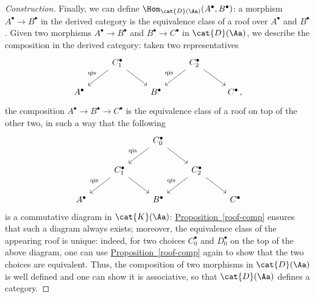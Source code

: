 \begin{thmdef}
\begin{proof}[Construction]
        Finally, we can define $\Hom_{\cat{D}(\Aa)}(A^{\bullet}, B^{\bullet})$:
        a morphism $A^{\bullet} \to B^{\bullet}$ in the derived category
        is the equivalence class of a roof 
        over $A^{\bullet}$ and $B^{\bullet}$. Given two morphisms
        $A^{\bullet} \to B^{\bullet}$ 
        and $B^{\bullet} \to C^{\bullet}$ in $\cat{D}(\Aa)$,
        we describe the composition in the derived category:
        taken two representatives
        \begin{equation*}
            \begin{tikzcd}
                & C_{1}^{\bullet} \ar[dl, "\textrm{qis}"'] \ar[dr]
                && C_{2}^{\bullet} \ar[dl, "\textrm{qis}"'] \ar[dr] & \\
                A^{\bullet} & & B^{\bullet} & & C^{\bullet}\,,
            \end{tikzcd}
        \end{equation*}
        the composition $A^{\bullet} \to B^{\bullet} \to C^{\bullet}$
        is the equivalence class of a roof on top of the other two,
        in such a way that the following
        \begin{equation*}
            \begin{tikzcd}
                && C_{0}^{\bullet} \ar[dl, "\textrm{qis}"'] \ar[dr] && \\
                & C_{1}^{\bullet} \ar[dl, "\textrm{qis}"'] \ar[dr]
                && C_{2}^{\bullet} \ar[dl, "\textrm{qis}"'] \ar[dr] & \\
                A^{\bullet} & & B^{\bullet} & & C^{\bullet}
            \end{tikzcd}
        \end{equation*}
        is a commutative diagram in $\cat{K}(\Aa)$: 
        \hyperref[roof-comp]{Proposition~\ref*{roof-comp}}
        ensures that such a diagram always exists; 
        moreover, the equivalence class of the
        appearing roof is unique: indeed, 
        for two choices $C_{0}^{\bullet}$
        and $D_{0}^{\bullet}$ on the top of the above diagram,
        one can use \hyperref[roof-comp]{Proposition~\ref*{roof-comp}}
        again to show that the two choices are equivalent.
        Thus, the composition of two morphisms in $\cat{D}(\Aa)$
        is well defined and one can show it is associative,
        so that $\cat{D}(\Aa)$ defines a category.


\end{proof}
\end{thmdef}
